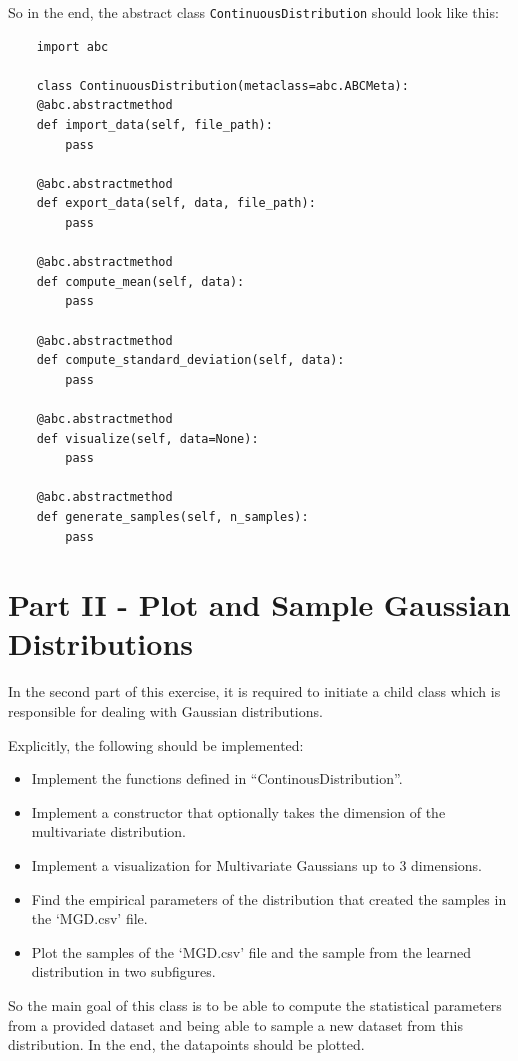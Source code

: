 \documentclass{CPSReport}
\begin{document}
So in the end, the abstract class \texttt{ContinuousDistribution} should look like this:

\begin{verbatim}
    import abc

    class ContinuousDistribution(metaclass=abc.ABCMeta):
    @abc.abstractmethod
    def import_data(self, file_path):
        pass

    @abc.abstractmethod
    def export_data(self, data, file_path):
        pass

    @abc.abstractmethod
    def compute_mean(self, data):
        pass

    @abc.abstractmethod
    def compute_standard_deviation(self, data):
        pass

    @abc.abstractmethod
    def visualize(self, data=None):
        pass

    @abc.abstractmethod
    def generate_samples(self, n_samples):
        pass
\end{verbatim}

\section{Part II - Plot and Sample Gaussian Distributions}
In the second part of this exercise, it is required to initiate a child class which is responsible for dealing with Gaussian distributions.

Explicitly, the following should be implemented:
\begin{itemize}
    \item Implement the functions defined in “ContinousDistribution”. 
    \item Implement a constructor that optionally takes the dimension of the multivariate distribution. 
    \item Implement a visualization for Multivariate Gaussians up to 3 dimensions.
    \item Find the empirical parameters of the distribution that created the samples in the ‘MGD.csv’ file.
    \item Plot the samples of the ‘MGD.csv’ file and the sample from the learned distribution in two subfigures.   
\end{itemize}

So the main goal of this class is to be able to compute the statistical parameters from a provided dataset and being able to sample a new dataset from this distribution. In the end, the datapoints should be plotted.
\end{document}
